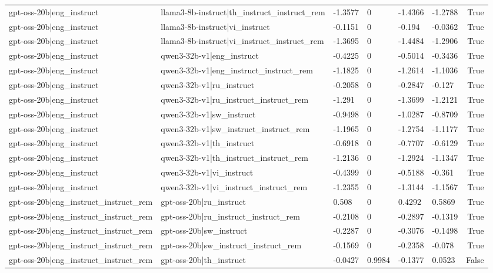 \begin{table}
\begin{tabular}{llllllr}
gpt-oss-20b|eng_instruct & llama3-8b-instruct|th_instruct_instruct_rem & -1.3577 & 0 & -1.4366 & -1.2788 & True \\
gpt-oss-20b|eng_instruct & llama3-8b-instruct|vi_instruct & -0.1151 & 0 & -0.194 & -0.0362 & True \\
gpt-oss-20b|eng_instruct & llama3-8b-instruct|vi_instruct_instruct_rem & -1.3695 & 0 & -1.4484 & -1.2906 & True \\
gpt-oss-20b|eng_instruct & qwen3-32b-v1|eng_instruct & -0.4225 & 0 & -0.5014 & -0.3436 & True \\
gpt-oss-20b|eng_instruct & qwen3-32b-v1|eng_instruct_instruct_rem & -1.1825 & 0 & -1.2614 & -1.1036 & True \\
gpt-oss-20b|eng_instruct & qwen3-32b-v1|ru_instruct & -0.2058 & 0 & -0.2847 & -0.127 & True \\
gpt-oss-20b|eng_instruct & qwen3-32b-v1|ru_instruct_instruct_rem & -1.291 & 0 & -1.3699 & -1.2121 & True \\
gpt-oss-20b|eng_instruct & qwen3-32b-v1|sw_instruct & -0.9498 & 0 & -1.0287 & -0.8709 & True \\
gpt-oss-20b|eng_instruct & qwen3-32b-v1|sw_instruct_instruct_rem & -1.1965 & 0 & -1.2754 & -1.1177 & True \\
gpt-oss-20b|eng_instruct & qwen3-32b-v1|th_instruct & -0.6918 & 0 & -0.7707 & -0.6129 & True \\
gpt-oss-20b|eng_instruct & qwen3-32b-v1|th_instruct_instruct_rem & -1.2136 & 0 & -1.2924 & -1.1347 & True \\
gpt-oss-20b|eng_instruct & qwen3-32b-v1|vi_instruct & -0.4399 & 0 & -0.5188 & -0.361 & True \\
gpt-oss-20b|eng_instruct & qwen3-32b-v1|vi_instruct_instruct_rem & -1.2355 & 0 & -1.3144 & -1.1567 & True \\
gpt-oss-20b|eng_instruct_instruct_rem & gpt-oss-20b|ru_instruct & 0.508 & 0 & 0.4292 & 0.5869 & True \\
gpt-oss-20b|eng_instruct_instruct_rem & gpt-oss-20b|ru_instruct_instruct_rem & -0.2108 & 0 & -0.2897 & -0.1319 & True \\
gpt-oss-20b|eng_instruct_instruct_rem & gpt-oss-20b|sw_instruct & -0.2287 & 0 & -0.3076 & -0.1498 & True \\
gpt-oss-20b|eng_instruct_instruct_rem & gpt-oss-20b|sw_instruct_instruct_rem & -0.1569 & 0 & -0.2358 & -0.078 & True \\
gpt-oss-20b|eng_instruct_instruct_rem & gpt-oss-20b|th_instruct & -0.0427 & 0.9984 & -0.1377 & 0.0523 & False \\

\end{tabular}
\end{table}
